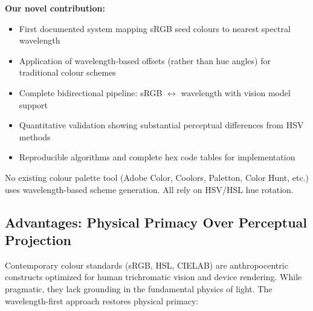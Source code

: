 \documentclass[12pt,a4paper]{article}
\begin{document}
\textbf{Our novel contribution:}
\begin{itemize}
\item First documented system mapping sRGB seed colours to nearest spectral wavelength
\item Application of wavelength-based offsets (rather than hue angles) for traditional colour schemes
\item Complete bidirectional pipeline: sRGB $\leftrightarrow$ wavelength with vision model support
\item Quantitative validation showing substantial perceptual differences from HSV methods
\item Reproducible algorithms and complete hex code tables for implementation
\end{itemize}

No existing colour palette tool (Adobe Color, Coolors, Paletton, Color Hunt, etc.) uses wavelength-based scheme generation. All rely on HSV/HSL hue rotation.

\subsection{Advantages: Physical Primacy Over Perceptual Projection}

Contemporary colour standards (sRGB, HSL, CIELAB) are anthropocentric constructs optimized for human trichromatic vision and device rendering. While pragmatic, they lack grounding in the fundamental physics of light. The wavelength-first approach restores physical primacy:
\end{document}
